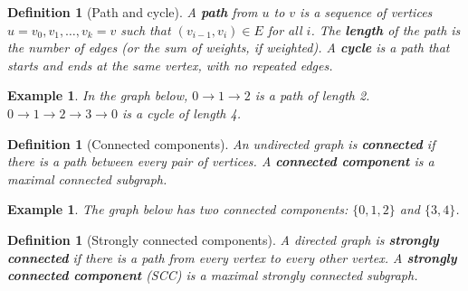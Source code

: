 \documentclass[11pt,a4paper]{article}
\newtheorem{definition}[theorem]{Definition}
\newtheorem{example}[theorem]{Example}
\begin{document}
\begin{definition}[Path and cycle]
A \textbf{path} from $u$ to $v$ is a sequence of vertices $u = v_0, v_1, \ldots, v_k = v$ such that $(v_{i-1}, v_i) \in E$ for all $i$. The \textbf{length} of the path is the number of edges (or the sum of weights, if weighted).
A \textbf{cycle} is a path that starts and ends at the same vertex, with no repeated edges.
\end{definition}

\begin{example}
In the graph below, $0 \to 1 \to 2$ is a path of length 2. $0 \to 1 \to 2 \to 3 \to 0$ is a cycle of length 4.
\begin{center}
\end{center}
\end{example}

\begin{definition}[Connected components]
An undirected graph is \textbf{connected} if there is a path between every pair of vertices. A \textbf{connected component} is a maximal connected subgraph.
\end{definition}

\begin{example}
The graph below has two connected components: $\{0, 1, 2\}$ and $\{3, 4\}$.
\begin{center}
\end{center}
\end{example}

\begin{definition}[Strongly connected components]
A directed graph is \textbf{strongly connected} if there is a path from every vertex to every other vertex. A \textbf{strongly connected component} (SCC) is a maximal strongly connected subgraph.
\end{definition}
\end{document}
